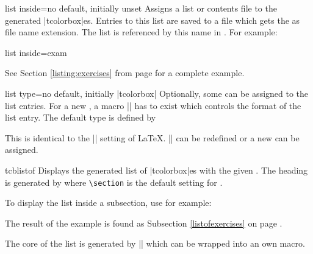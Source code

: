 \begin{newTcbKey}{list inside}{=}{no default, initially unset}
Assigns a list or contents file to the generated |tcolorbox|es.
Entries to this list are saved to a file which gets the  as
file name extension. The list is referenced by this name in
.
For example:
\begin{dispListing}
list inside=exam
\end{dispListing}
See Section \ref{listing:exercises} from page \pageref{listing:exercises}
for a complete example.
\end{newTcbKey}


\begin{newTcbKey}{list type}{=}{no default, initially |tcolorbox|}
Optionally, some  can be assigned to the list entries.
For a new , a macro |\l@| has to exist which controls
the format of the list entry. The default type is defined by
\begin{dispListing}
\newcommand*\l@tcolorbox{\@dottedtocline{1}{1.5em}{2.3em}}
\end{dispListing}
This is identical to the |\l@section| setting of \LaTeX. |\l@tcolorbox| can
be redefined or a new  can be assigned.
\end{newTcbKey}


\begin{docCommand}{tcblistof}{}
Displays the generated list of |tcolorbox|es with the given .
The heading is generated by  where \texttt{\textbackslash section}
is the default setting for .\par
To display the list inside a subsection, use for example:
\begin{dispListing}
\end{dispListing}
The result of the example is found as Subsection \ref{listofexercises} on
page \pageref{listofexercises}.
\begin{marker}
The core of the list is generated by |\@starttoc| which
can be wrapped into an own macro.
\end{marker}
\end{docCommand}

